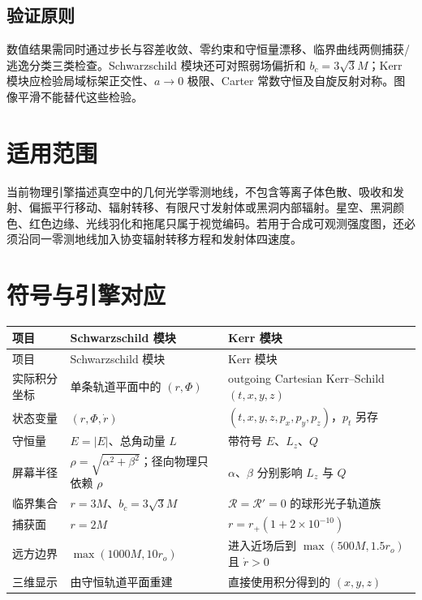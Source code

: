 \documentclass[UTF8,11pt,a4paper,fontset=fandol]{ctexart}
\newcommand{\Rpot}{\mathcal R}
\begin{document}
\subsection{验证原则}

数值结果需同时通过步长与容差收敛、零约束和守恒量漂移、临界曲线两侧捕获/逃逸分类三类检查。Schwarzschild 模块还可对照弱场偏折和 \(b_c=3\sqrt3M\)；Kerr 模块应检验局域标架正交性、\(a\to0\) 极限、Carter 常数守恒及自旋反射对称。图像平滑不能替代这些检验。

\section{适用范围}

当前物理引擎描述真空中的几何光学零测地线，不包含等离子体色散、吸收和发射、偏振平行移动、辐射转移、有限尺寸发射体或黑洞内部辐射。星空、黑洞颜色、红色边缘、光线羽化和拖尾只属于视觉编码。若用于合成可观测强度图，还必须沿同一零测地线加入协变辐射转移方程和发射体四速度。

\appendix

\section{符号与引擎对应}

\begin{longtable}{>{\raggedright\arraybackslash}p{}>{\raggedright\arraybackslash}p{}>{\raggedright\arraybackslash}p{}}
\toprule
项目 & Schwarzschild 模块 & Kerr 模块\\
\midrule
\endfirsthead
\toprule
项目 & Schwarzschild 模块 & Kerr 模块\\
\midrule
\endhead
实际积分坐标 & 单条轨道平面中的 \((r,\Phi)\) & outgoing Cartesian Kerr--Schild \((t,x,y,z)\)\\
状态变量 & \((r,\Phi,\dot r)\) & \((t,x,y,z,p_x,p_y,p_z)\)，\(p_t\) 另存\\
守恒量 & \(E=|E|\)、总角动量 \(L\) & 带符号 \(E\)、\(L_z\)、\(Q\)\\
屏幕半径 & \(\rho=\sqrt{\alpha^2+\beta^2}\)；径向物理只依赖 \(\rho\) & \(\alpha\)、\(\beta\) 分别影响 \(L_z\) 与 \(Q\)\\
临界集合 & \(r=3M\)、\(b_c=3\sqrt3M\) & \(\Rpot=\Rpot'=0\) 的球形光子轨道族\\
捕获面 & \(r=2M\) & \(r=r_+(1+2\times10^{-10})\)\\
远方边界 & \(\max(1000M,10r_o)\) & 进入近场后到 \(\max(500M,1.5r_o)\) 且 \(\dot r>0\)\\
三维显示 & 由守恒轨道平面重建 & 直接使用积分得到的 \((x,y,z)\)\\
\bottomrule
\end{longtable}
\end{document}
